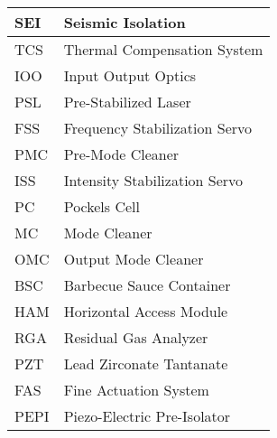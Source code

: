\begin{table}[!h]
\begin{center}
\begin{tabular}{|l|l|}
SEI                & Seismic Isolation                                 \\ \hline

TCS                & Thermal Compensation System   		       \\ \hline
					      			       
IOO                & Input Output Optics                               \\ \hline
					      			       		
PSL                & Pre-Stabilized Laser     			       \\ \hline

FSS                & Frequency Stabilization Servo   		       \\ \hline
					      			       
PMC                & Pre-Mode Cleaner                                  \\ \hline
					      			       		
ISS                & Intensity Stabilization Servo     		       \\ \hline

PC                 & Pockels Cell                                      \\ \hline

MC                 & Mode Cleaner				        \\ \hline
								       		
OMC                & Output Mode Cleaner				\\ \hline

BSC                & Barbecue Sauce Container				\\ \hline
					      			       
HAM                & Horizontal Access Module                           \\ \hline
					      			       		
RGA                & Residual Gas Analyzer     			       \\ \hline

PZT                & Lead Zirconate Tantanate   		       \\ \hline
					      			       
FAS                & Fine Actuation System                              \\ \hline
					      			       		
PEPI               & Piezo-Electric Pre-Isolator     		       \\ \hline


\end{tabular}
\end{center}
\end{table}
